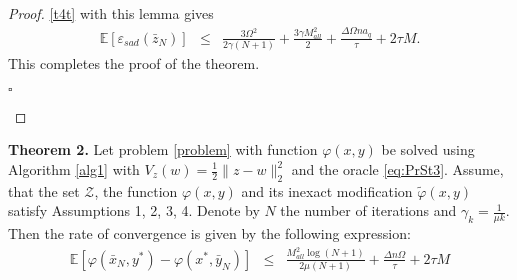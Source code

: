 \documentclass[runningheads]{llncs}
\newcommand{\EndProof}{\begin{flushright}$\square$\end{flushright}}
\newcommand{\EE}{\mathbf{E}}
\def\EE{\mathbb E}
\begin{document}
\begin{proof}
\eqref{t4t} with this lemma gives
\begin{eqnarray*}
    \mathbb{E}\left[\varepsilon_{sad}(\bar z_N)\right] &\leq&
    \frac{3\Omega^2}{2 \gamma (N+1)} + \frac{3\gamma M^2_{all}}{2} + \frac{\Delta \Omega n a_q}{\tau} + 2\tau M.
\end{eqnarray*} 
This completes the proof of the theorem.
\EndProof
\end{proof}

\textbf{Theorem 2.} 
Let problem \eqref{problem} with function $\varphi(x,y)$ be solved using Algorithm \ref{alg1} with $V_z(w) = \frac{1}{2}\|z-w\|^2_2$ and the oracle \eqref{eq:PrSt3}. Assume, that the set $\mathcal{Z}$, the function  $\varphi(x,y)$ and its inexact modification $\widetilde{\varphi}(x,y)$ satisfy Assumptions 1, 2, 3, 4. Denote by $N$ the number of iterations and $\gamma_k = \frac{1}{\mu k}$. Then the rate of convergence is given by the following expression:
\begin{eqnarray*}
\EE\left[\varphi(\bar x_N, y^*) - \varphi(x^*, \bar y_N)\right]
    &\leq& \frac{M^2_{all} \log (N+1)}{2 \mu (N+1)} + \frac{\Delta n\Omega}{\tau} + 2\tau M
\end{eqnarray*} 
\end{document}
